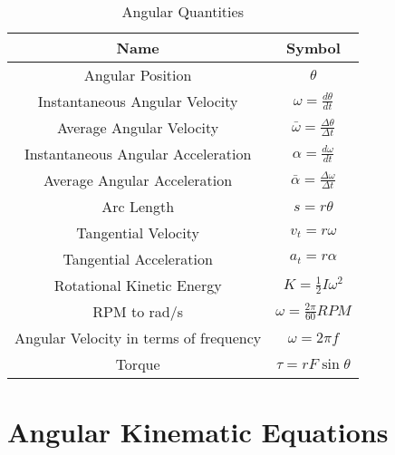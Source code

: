 \documentclass{report}
\begin{document}
\begin{table}[h!]
  \caption{Angular Quantities}
  \label{tab:angular-quantities}
  \begin{center}
    \begin{tabular}[c]{|c|c|}
      \hline 
      Name & Symbol \\
      \hline
      Angular Position & $ \theta $ \\ 
      \hline 
      Instantaneous Angular Velocity & $ \omega = \frac{d\theta }{dt} $ \\ 
      \hline 
      Average Angular Velocity & $ \bar{\omega} = \frac{\Delta \theta}{\Delta t} $ \\
      \hline
      Instantaneous Angular Acceleration & $ \alpha = \frac{d\omega}{dt} $ \\ 
      \hline 
      Average Angular Acceleration & $ \bar{\alpha} = \frac{\Delta \omega}{\Delta t} $ \\ 
      \hline
      Arc Length & $ s = r\theta $ \\
      \hline 
      Tangential Velocity & $ v_t = r\omega $ \\
      \hline 
      Tangential Acceleration & $ a_t = r\alpha $ \\
      \hline 
      Rotational Kinetic Energy & $ K = \frac{1}{2}I\omega^2 $ \\
      \hline 
      RPM to rad/s & $ \omega = \frac{2\pi}{60}RPM $ \\
      \hline 
      Angular Velocity in terms of frequency & $ \omega = 2\pi f $ \\
      Torque & $ \tau = rF\sin{\theta} $ \\ 
      
      \hline
    \end{tabular}
  \end{center}
\end{table}

\section{Angular Kinematic Equations}

\end{document}
